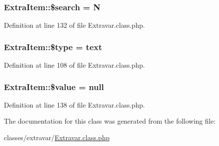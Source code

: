 \subsubsection[{\$search}]{\setlength{\rightskip}{0pt plus 5cm}Extra\+Item\+::\$search = \textquotesingle{}N\textquotesingle{}}\label{classExtraItem_a086e30bc8e2d078ad1108d00ae58a60c}


Definition at line 132 of file Extravar.\+class.\+php.

\hypertarget{classExtraItem_ac965cc202d067c0449be9976045fd4be}{}
\subsubsection[{\$type}]{\setlength{\rightskip}{0pt plus 5cm}Extra\+Item\+::\$type = \textquotesingle{}text\textquotesingle{}}\label{classExtraItem_ac965cc202d067c0449be9976045fd4be}


Definition at line 108 of file Extravar.\+class.\+php.

\hypertarget{classExtraItem_a46622b49026acdfce833d5118a43986d}{}
\subsubsection[{\$value}]{\setlength{\rightskip}{0pt plus 5cm}Extra\+Item\+::\$value = null}\label{classExtraItem_a46622b49026acdfce833d5118a43986d}


Definition at line 138 of file Extravar.\+class.\+php.



The documentation for this class was generated from the following file\+:\begin{DoxyCompactItemize}
\item 
classes/extravar/\hyperlink{Extravar_8class_8php}{Extravar.\+class.\+php}\end{DoxyCompactItemize}
